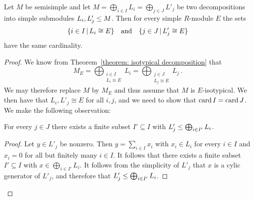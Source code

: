 \begin{theorem}
  \label{theorem: multiplicity well-defined}
  Let $M$ be semisimple and let $M = \bigoplus_{i \in I} L_i = \bigoplus_{j \in J} L'_j$ be two decompositions into simple submodules $L_i, L'_j \leq M$.
  Then for every simple $R$-module $E$ the sets
  \[
    \{ i \in I \suchthat L_i \cong E \}
    \quad\text{and}\quad
    \{ j \in J \suchthat L'_j \cong E \}
  \]
  have the same cardinality.
\end{theorem}


\begin{proof}
  We know from Theorem~\ref{theorem: isotypical decomposition} that
  \[
      M_E
    = \bigoplus_{\substack{i \in I \\ L_i \cong E}} L_i
    = \bigoplus_{\substack{j \in J \\ L_j \cong E}} L_j \,.
  \]
  We may therefore replace $M$ by $M_E$ and thus assume that $M$ is $E$-isotypical.
  We then have that $L_i, L'_j \cong E$ for all $i, j$, and we need to show that $\operatorname{card}{I} = \operatorname{card}{J}$.
  We make the following observation:
  
  \begin{claim}
    For every $j \in J$ there exists a finite subset $I' \subseteq I$ with $L'_j \leq \bigoplus_{i \in I'} L_i$.
  \end{claim}
  
  \begin{proof}
    Let $y \in L'_j$ be nonzero.
    Then $y = \sum_{i \in I} x_i$ with $x_i \in L_i$ for every $i \in I$ and $x_i = 0$ for all but finitely many $i \in I$.
    It follows that there exists a finite subset $I' \subseteq I$ with $x \in \bigoplus_{i \in I'} L_i$.
    It follows from the simplicity of $L'_j$ that $x$ is a cylic generator of $L'_j$, and therefore that $L'_j \leq \bigoplus_{i \in I'} L_i$.
  \end{proof}
  

\end{proof}
